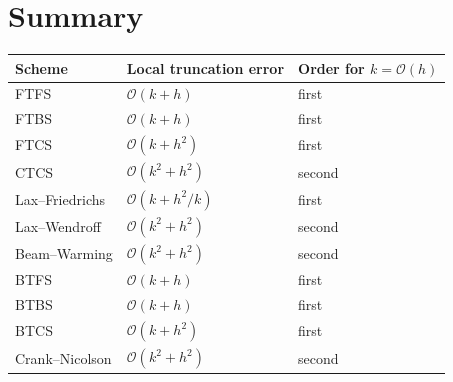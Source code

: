 \documentclass[11pt]{article}
\newcommand{\Oh}{\mathcal{O}}
\begin{document}
\section{Summary}

\begin{table}[h]
\centering
\begin{tabular}{@{}lll@{}}
\toprule
Scheme & Local truncation error & Order for $k=\Oh(h)$\\
\midrule
FTFS & $\Oh(k+h)$ & first\\
FTBS & $\Oh(k+h)$ & first\\
FTCS & $\Oh(k+h^2)$ & first\\
CTCS & $\Oh(k^2+h^2)$ & second\\
Lax--Friedrichs & $\Oh(k+h^2/k)$ & first\\
Lax--Wendroff & $\Oh(k^2+h^2)$ & second\\
Beam--Warming & $\Oh(k^2+h^2)$ & second\\
BTFS & $\Oh(k+h)$ & first\\
BTBS & $\Oh(k+h)$ & first\\
BTCS & $\Oh(k+h^2)$ & first\\
Crank--Nicolson & $\Oh(k^2+h^2)$ & second\\
\bottomrule
\end{tabular}
\end{table}
\end{document}

